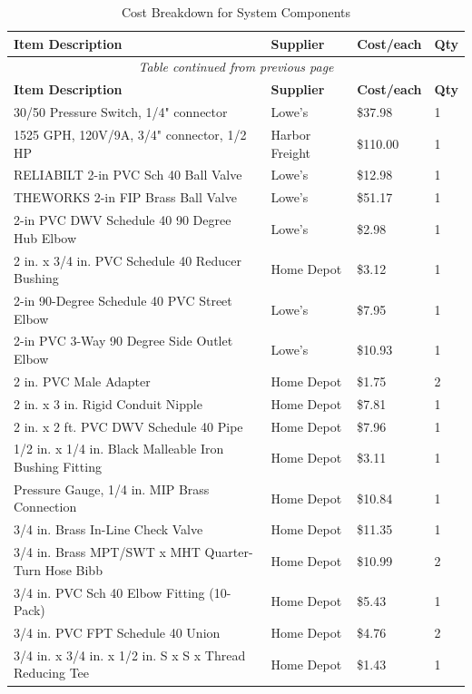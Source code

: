\documentclass[12pt]{article}
\begin{document}
\begin{longtable}{|p{8cm}|p{2.5cm}|p{2cm}|p{1cm}|}
\caption{Cost Breakdown for System Components}\\
\hline
\textbf{Item Description} & \textbf{Supplier} & \textbf{Cost/each} & \textbf{Qty} \\ \hline
\endfirsthead
\multicolumn{4}{c}{\textit{Table continued from previous page}}\\ \hline
\textbf{Item Description} & \textbf{Supplier} & \textbf{Cost/each} & \textbf{Qty} \\ \hline
\endhead
30/50 Pressure Switch, 1/4" connector & Lowe's & \$37.98 & 1 \\ \hline
1525 GPH, 120V/9A, 3/4" connector, 1/2 HP & Harbor Freight & \$110.00 & 1 \\ \hline
RELIABILT 2-in PVC Sch 40 Ball Valve & Lowe's & \$12.98 & 1 \\ \hline
THEWORKS 2-in FIP Brass Ball Valve & Lowe's & \$51.17 & 1 \\ \hline
2-in PVC DWV Schedule 40 90 Degree Hub Elbow & Lowe's & \$2.98 & 1 \\ \hline
2 in. x 3/4 in. PVC Schedule 40 Reducer Bushing & Home Depot & \$3.12 & 1 \\ \hline
2-in 90-Degree Schedule 40 PVC Street Elbow & Lowe's & \$7.95 & 1 \\ \hline
2-in PVC 3-Way 90 Degree Side Outlet Elbow & Lowe's & \$10.93 & 1 \\ \hline
2 in. PVC Male Adapter & Home Depot & \$1.75 & 2 \\ \hline
2 in. x 3 in. Rigid Conduit Nipple & Home Depot & \$7.81 & 1 \\ \hline
2 in. x 2 ft. PVC DWV Schedule 40 Pipe & Home Depot & \$7.96 & 1 \\ \hline
1/2 in. x 1/4 in. Black Malleable Iron Bushing Fitting & Home Depot & \$3.11 & 1 \\ \hline
Pressure Gauge, 1/4 in. MIP Brass Connection & Home Depot & \$10.84 & 1 \\ \hline
3/4 in. Brass In-Line Check Valve & Home Depot & \$11.35 & 1 \\ \hline
3/4 in. Brass MPT/SWT x MHT Quarter-Turn Hose Bibb & Home Depot & \$10.99 & 2 \\ \hline
3/4 in. PVC Sch 40 Elbow Fitting (10-Pack) & Home Depot & \$5.43 & 1 \\ \hline
3/4 in. PVC FPT Schedule 40 Union & Home Depot & \$4.76 & 2 \\ \hline
3/4 in. x 3/4 in. x 1/2 in. S x S x Thread Reducing Tee & Home Depot & \$1.43 & 1 \\ \hline

\end{longtable}
\end{document}
